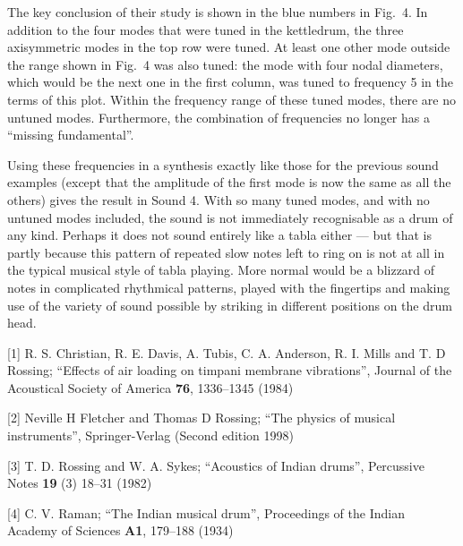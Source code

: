   The key conclusion of their study is shown in the blue numbers in Fig.\ 4. In 
  addition to the four modes that were tuned in the kettledrum, the three 
  axisymmetric modes in the top row were tuned. At least one other mode outside 
  the range shown in Fig.\ 4 was also tuned: the mode with four nodal 
  diameters, which would be the next one in the first column, was tuned to 
  frequency 5 in the terms of this plot. Within the frequency range of these 
  tuned modes, there are no untuned modes. Furthermore, the combination of 
  frequencies no longer has a ``missing fundamental''. 

  Using these frequencies in a synthesis exactly like those for the previous 
  sound examples (except that the amplitude of the first mode is now the same 
  as all the others) gives the result in Sound 4. With so many tuned modes, and 
  with no untuned modes included, the sound is not immediately recognisable as 
  a drum of any kind. Perhaps it does not sound entirely like a tabla either 
  --- but that is partly because this pattern of repeated slow notes left to 
  ring on is not at all in the typical musical style of tabla playing. More 
  normal would be a blizzard of notes in complicated rhythmical patterns, 
  played with the fingertips and making use of the variety of sound possible by 
  striking in different positions on the drum head. 




  \sectionreferences{}[1] R. S. Christian, R. E. Davis, A. Tubis, C. A. 
  Anderson, R. I. Mills and T. D Rossing; ``Effects of air loading on timpani 
  membrane vibrations'', Journal of the Acoustical Society of America 
  \textbf{76}, 1336--1345 (1984) 

  [2] Neville H Fletcher and Thomas D Rossing; ``The physics of musical 
  instruments'', Springer-Verlag (Second edition 1998) 

  [3] T. D. Rossing and W. A. Sykes; ``Acoustics of Indian drums'', Percussive 
  Notes \textbf{19} (3) 18--31 (1982) 

  [4] C. V. Raman; ``The Indian musical drum'', Proceedings of the Indian 
  Academy of Sciences \textbf{A1}, 179--188 (1934) 